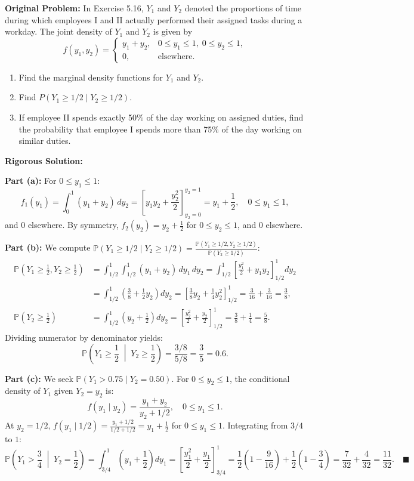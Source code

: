 \documentclass[11pt, letterpaper]{article}
\theoremstyle{definition}
\theoremstyle{remark}
\newcommand{\Prob}{\mathbb{P}}
\begin{document}
\textbf{Original Problem:}
In Exercise 5.16, $Y_1$ and $Y_2$ denoted the proportions of time during which employees I and II actually performed their assigned tasks during a workday. The joint density of $Y_1$ and $Y_2$ is given by
\[ f(y_1, y_2) = \begin{cases} y_1 + y_2, & 0 \le y_1 \le 1, \; 0 \le y_2 \le 1, \\ 0, & \text{elsewhere.} \end{cases} \]
\begin{enumerate}[label=\textbf{\alph*}]
    \item Find the marginal density functions for $Y_1$ and $Y_2$.
    \item Find $P(Y_1 \ge 1/2 \mid Y_2 \ge 1/2)$.
    \item If employee II spends exactly 50\% of the day working on assigned duties, find the probability that employee I spends more than 75\% of the day working on similar duties.
\end{enumerate}

\textbf{Rigorous Solution:}

\textbf{Part (a):} For $0 \le y_1 \le 1$:
\[ f_1(y_1) = \int_0^1 (y_1 + y_2) \, dy_2 = \left[ y_1 y_2 + \frac{y_2^2}{2} \right]_{y_2=0}^{y_2=1} = y_1 + \frac{1}{2}, \quad 0 \le y_1 \le 1, \]
and $0$ elsewhere. By symmetry, $f_2(y_2) = y_2 + \frac{1}{2}$ for $0 \le y_2 \le 1$, and $0$ elsewhere.

\textbf{Part (b):} We compute $\Prob(Y_1 \ge 1/2 \mid Y_2 \ge 1/2) = \frac{\Prob(Y_1 \ge 1/2, Y_2 \ge 1/2)}{\Prob(Y_2 \ge 1/2)}$:
\begin{align*}
    \Prob\left(Y_1 \ge \frac{1}{2}, Y_2 \ge \frac{1}{2}\right) &= \int_{1/2}^1 \int_{1/2}^1 (y_1 + y_2) \, dy_1 \, dy_2 = \int_{1/2}^1 \left[ \frac{y_1^2}{2} + y_1 y_2 \right]_{1/2}^1 dy_2 \\
    &= \int_{1/2}^1 \left( \frac{3}{8} + \frac{1}{2}y_2 \right) dy_2 = \left[ \frac{3}{8}y_2 + \frac{1}{4}y_2^2 \right]_{1/2}^1 = \frac{3}{16} + \frac{3}{16} = \frac{3}{8}, \\
    \Prob\left(Y_2 \ge \frac{1}{2}\right) &= \int_{1/2}^1 \left(y_2 + \frac{1}{2}\right) dy_2 = \left[ \frac{y_2^2}{2} + \frac{y_2}{2} \right]_{1/2}^1 = \frac{3}{8} + \frac{1}{4} = \frac{5}{8}.
\end{align*}
Dividing numerator by denominator yields:
\[ \Prob\left(Y_1 \ge \frac{1}{2} \;\middle|\; Y_2 \ge \frac{1}{2}\right) = \frac{3/8}{5/8} = \frac{3}{5} = 0.6. \]

\textbf{Part (c):} We seek $\Prob(Y_1 > 0.75 \mid Y_2 = 0.50)$. For $0 \le y_2 \le 1$, the conditional density of $Y_1$ given $Y_2 = y_2$ is:
\[ f(y_1 \mid y_2) = \frac{y_1 + y_2}{y_2 + 1/2}, \quad 0 \le y_1 \le 1. \]
At $y_2 = 1/2$, $f(y_1 \mid 1/2) = \frac{y_1 + 1/2}{1/2 + 1/2} = y_1 + \frac{1}{2}$ for $0 \le y_1 \le 1$. Integrating from $3/4$ to $1$:
\[ \Prob\left(Y_1 > \frac{3}{4} \;\middle|\; Y_2 = \frac{1}{2}\right) = \int_{3/4}^1 \left(y_1 + \frac{1}{2}\right) dy_1 = \left[ \frac{y_1^2}{2} + \frac{y_1}{2} \right]_{3/4}^1 = \frac{1}{2}\left(1 - \frac{9}{16}\right) + \frac{1}{2}\left(1 - \frac{3}{4}\right) = \frac{7}{32} + \frac{4}{32} = \frac{11}{32}. \quad \blacksquare \]
\end{document}
